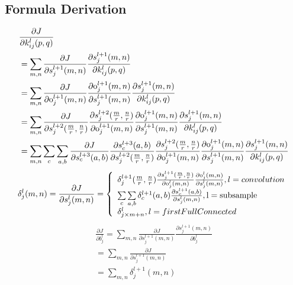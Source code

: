 \documentclass[runningheads,openany]{xhlPaper}
\begin{document}
\subsection{Formula Derivation}
\begin{equation}
\begin{aligned}
&\frac{{\partial J}}{{\partial k_{ij}^l(p,q)}}\\
&= \sum\limits_{m,n} {\frac{{\partial J}}{{\partial s_j^{l + 1}(m,n)}}} \frac{{\partial s_j^{l + 1}(m,n)}}{{\partial k_{ij}^{l}(p,q)}}\\
&= \sum\limits_{m,n} {\frac{{\partial J}}{{\partial {\rm{o}}_j^{l + 1}(m,n)}}\frac{{\partial {\rm{o}}_j^{l + 1}(m,n)}}{{\partial s_j^{l + 1}(m,n)}}} \frac{{\partial s_j^{l + 1}(m,n)}}{{\partial k_{ij}^{l}(p,q)}}\\
&= \sum\limits_{m,n} {\frac{{\partial J}}{{\partial s_j^{l + 2}(\frac{m}{r},\frac{n}{r})}}\frac{{\partial s_j^{l + 2}(\frac{m}{r},\frac{n}{r})}}{{\partial {\rm{o}}_j^{l + 1}(m,n)}}\frac{{\partial {\rm{o}}_j^{l + 1}(m,n)}}{{\partial s_j^{l + 1}(m,n)}}} \frac{{\partial s_j^{l + 1}(m,n)}}{{\partial k_{ij}^{l}(p,q)}}\\
&= \sum\limits_{m,n} {\sum\limits_c {\sum\limits_{a,b} {\frac{{\partial J}}{{\partial s_c^{l + 3}(a,b)}}\frac{{\partial s_c^{l + 3}(a,b)}}{{\partial s_j^{l + 2}(\frac{m}{r},\frac{n}{r})}}\frac{{\partial s_j^{l + 2}(\frac{m}{r},\frac{n}{r})}}{{\partial {\rm{o}}_j^{l + 1}(m,n)}}\frac{{\partial {\rm{o}}_j^{l + 1}(m,n)}}{{\partial s_j^{l + 1}(m,n)}}} } } \frac{{\partial s_j^{l + 1}(m,n)}}{{\partial k_{ij}^{l}(p,q)}}
\end{aligned}
\end{equation}
\begin{equation}
\label{cnnDelta}
\delta _j^l(m,n) = \frac{{\partial J}}{{\partial s_j^l(m,n)}} = \left\{ {\begin{array}{*{20}{l}}
{{\delta _j^{l + 1}(\frac{m}{r},\frac{n}{r})}\frac{{\partial s_j^{l + 1}(\frac{m}{r},\frac{n}{r})}}{{\partial {\rm{o}}_j^l(m,n)}}\frac{{\partial {\rm{o}}_j^l(m,n)}}{{\partial s_j^l(m,n)}},{{l = convolution}}}\\
{\sum\limits_c {\sum\limits_{a,b} {{\delta _c^{l + 1}(a,b)}\frac{{\partial s_c^{l + 1}(a,b)}}{{\partial s_j^l(m,n)}},{\rm{l = subsample}}} } }\\
{{\delta ^{l}_{j \times m + n}},{{l = firstFullConnected}}}
\end{array}} \right.
\end{equation}
\begin{equation}
\label{cnnBias}
\begin{array}{c}
\frac{{\partial J}}{{\partial b_j^l}} = \sum\limits_{m,n} {\frac{{\partial J}}{{\partial s_j^{l + 1}(m,n)}}} \frac{{\partial s_j^{l + 1}(m,n)}}{{\partial b_j^l}}\\
 = \sum\limits_{m,n} {\frac{{\partial J}}{{\partial s_j^{l + 1}(m,n)}}} \\
 = \sum\limits_{m,n} {\delta _j^{l + 1}(m,n)} 
\end{array}
\end{equation}
\end{document}
